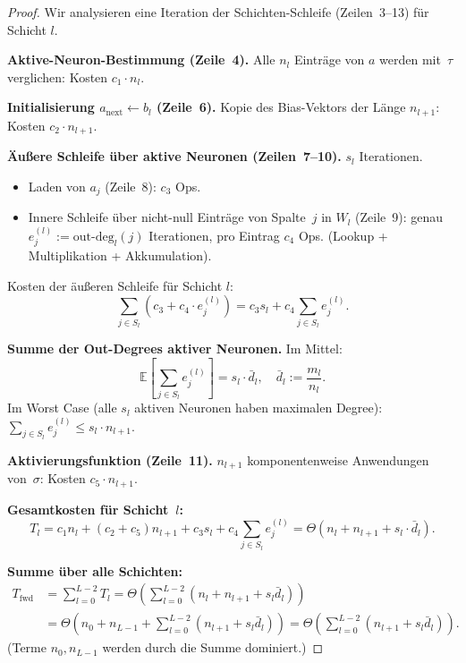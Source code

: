 \documentclass[a4paper,12pt]{report}
\theoremstyle{definition}
\begin{document}
	\begin{proof}
		Wir analysieren eine Iteration der Schichten-Schleife (Zeilen~3--13) für Schicht $l$.

		\textbf{Aktive-Neuron-Bestimmung (Zeile~4).} Alle $n_l$ Einträge von $a$ werden mit~$\tau$ verglichen: Kosten $c_1 \cdot n_l$.

		\textbf{Initialisierung $a_{\mathrm{next}} \gets b_l$ (Zeile~6).} Kopie des Bias-Vektors der Länge $n_{l+1}$: Kosten $c_2 \cdot n_{l+1}$.

		\textbf{Äußere Schleife über aktive Neuronen (Zeilen~7--10).} $s_l$ Iterationen.
		\begin{itemize}
			\item Laden von $a_j$ (Zeile~8): $c_3$ Ops.
			\item Innere Schleife über nicht-null Einträge von Spalte~$j$ in $W_l$ (Zeile~9): genau $e_j^{(l)} := \mathrm{out\text{-}deg}_l(j)$ Iterationen, pro Eintrag $c_4$ Ops. (Lookup + Multiplikation + Akkumulation).
		\end{itemize}
		Kosten der äußeren Schleife für Schicht $l$:
		\[
			\sum_{j \in S_l} (c_3 + c_4 \cdot e_j^{(l)}) = c_3 s_l + c_4 \sum_{j \in S_l} e_j^{(l)}.
		\]

		\textbf{Summe der Out-Degrees aktiver Neuronen.} Im Mittel:
		\[
			\mathbb{E}\!\left[\sum_{j \in S_l} e_j^{(l)}\right] = s_l \cdot \bar{d}_l, \quad \bar{d}_l := \frac{m_l}{n_l}.
		\]
		Im Worst Case (alle $s_l$ aktiven Neuronen haben maximalen Degree): $\sum_{j \in S_l} e_j^{(l)} \leq s_l \cdot n_{l+1}$.

		\textbf{Aktivierungsfunktion (Zeile~11).} $n_{l+1}$ komponentenweise Anwendungen von~$\sigma$: Kosten $c_5 \cdot n_{l+1}$.

		\textbf{Gesamtkosten für Schicht~$l$:}
		\[
			T_l = c_1 n_l + (c_2 + c_5) n_{l+1} + c_3 s_l + c_4 \sum_{j \in S_l} e_j^{(l)}
			= \Theta\!\left(n_l + n_{l+1} + s_l \cdot \bar{d}_l\right).
		\]

		\textbf{Summe über alle Schichten:}
		\begin{align*}
			T_{\mathrm{fwd}} &= \sum_{l=0}^{L-2} T_l
			= \Theta\!\left(\sum_{l=0}^{L-2} \left(n_l + n_{l+1} + s_l \bar{d}_l\right)\right) \\
			&= \Theta\!\left(n_0 + n_{L-1} + \sum_{l=0}^{L-2}\left(n_{l+1} + s_l \bar{d}_l\right)\right)
			= \Theta\!\left(\sum_{l=0}^{L-2}\left(n_{l+1} + s_l \bar{d}_l\right)\right).
		\end{align*}
		(Terme $n_0, n_{L-1}$ werden durch die Summe dominiert.)


\end{proof}
\end{document}
